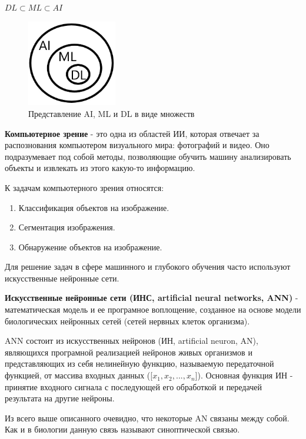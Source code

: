 \documentclass[bachelor, och, coursework]{shiza}
\begin{document}
\begin{center}
    $ DL \subset ML \subset AI$
\end{center}

\begin{figure}[H]
    \centering
    \includegraphics[width=0.35\textwidth]{2}
    \caption{Представление AI, ML и DL в виде множеств}
    \label{fig:img1}
\end{figure}

\textbf{Компьютерное зрение} - это одна из областей ИИ, которая отвечает за распознования компьютером визуального мира: фотографий и видео.
Оно подразумевает под собой методы, позволяющие обучить машину анализировать объекты и извлекать из этого какую-то информацию.

К задачам компьютерного зрения относятся:

\begin{enumerate}
    \item Классификация объектов на изображение.
    \item Сегментация изображения.
    \item Обнаружение объектов на изображение.
\end{enumerate}

Для решение задач в сфере машинного и глубокого обучения часто используют искусственные нейронные сети.

\textbf{Искусственные нейронные сети (ИНС, artificial neural networks, ANN)} - математическая модель и ее програмное воплощение, созданное
на основе модели биологических нейронных сетей (сетей нервных клеток организма).

ANN состоит из искусственных нейронов (ИН, artificial neuron, AN), являющихся програмной реализацией нейронов живых организмов и представляющих
из себя нелинейную функцию, называемую передаточной функцией, от массива входных данных ([$x_1, x_2, ..., x_n$]). Основная функция ИН - принятие 
входного сигнала с последующей его обработкой и передачей результата на другие нейроны.

Из всего выше описанного очевидно, что некоторые AN связаны между собой. Как и в биологии данную связь называют синоптической связью.
\end{document}

